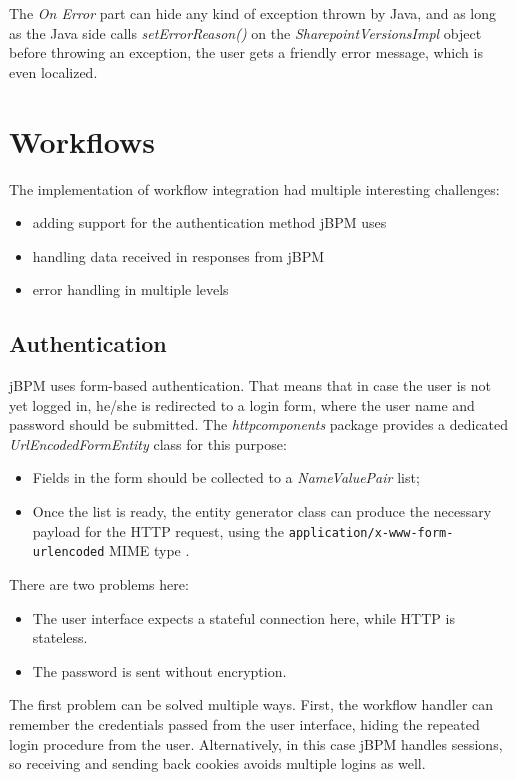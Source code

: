 The \emph{On Error} part can hide any kind of exception thrown by Java, and as
long as the Java side calls \emph{setErrorReason()} on the
\emph{SharepointVersionsImpl} object before throwing an exception, the user gets
a friendly error message, which is even localized.

\section{Workflows}

The implementation of workflow integration had multiple interesting challenges:

\begin{itemize}
\item adding support for the authentication method jBPM uses
\item handling data received in responses from jBPM
\item error handling in multiple levels
\end{itemize}

\subsection{Authentication}

jBPM uses form-based authentication. That means that in case the user is not
yet logged in, he/she is redirected to a login form, where the user name and
password should be submitted. The \emph{httpcomponents} package provides a
dedicated \emph{UrlEncodedFormEntity} class for this purpose:

\begin{itemize}
\item Fields in the form should be collected to a \emph{NameValuePair} list;
\item Once the list is ready, the entity generator class can produce the
necessary payload for the HTTP request, using the
\texttt{application/x-www-form-urlencoded} MIME type \cite{form-encoding}.
\end{itemize}

There are two problems here:

\begin{itemize}
\item The user interface expects a stateful connection here, while HTTP is stateless.
\item The password is sent without encryption.
\end{itemize}

The first problem can be solved multiple ways. First, the workflow handler can
remember the credentials passed from the user interface, hiding the repeated
login procedure from the user. Alternatively, in this case jBPM handles
sessions, so receiving and sending back cookies avoids multiple logins as well.

